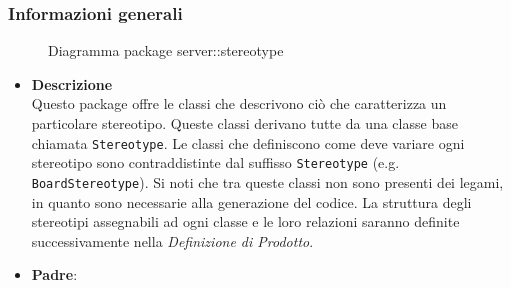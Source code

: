 \subsubsection{Informazioni generali}
\begin{figure}[H]
	\caption{Diagramma package server::stereotype}
\end{figure}
\begin{itemize}
\item \textbf{Descrizione}\\
Questo package offre le classi che descrivono ciò che caratterizza un particolare stereotipo. Queste classi derivano tutte da una classe base chiamata \texttt{Stereotype}. Le classi che definiscono come deve variare ogni stereotipo sono contraddistinte dal suffisso \texttt{Stereotype} (e.g. \texttt{BoardStereotype}). Si noti che tra queste classi non sono presenti dei legami, in quanto sono necessarie alla generazione del codice. La struttura degli stereotipi assegnabili ad ogni classe e le loro relazioni saranno definite successivamente nella \emph{Definizione di Prodotto}.
\item \textbf{Padre}: \hyperref[\nogloxy{swedesigner::server}]{}
\end{itemize}

\subsection{}
\label{\nogloxy{swedesigner::server::template}}
